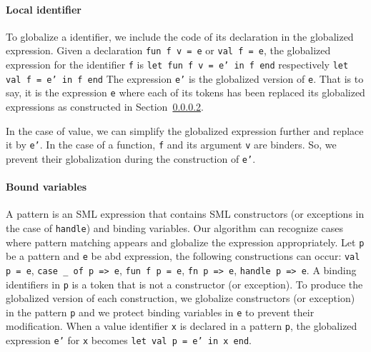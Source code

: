 \documentclass[runningheads,a4paper,draft]{svjour3}
\def\sml{\textsf{SML}\xspace}
\begin{document}
\paragraph{Local identifier}

To globalize a identifier, we include 
the code of its declaration in the globalized expression. 
Given a declaration \texttt{fun f v = e} or \texttt{val f = e}, the globalized 
expression for the identifier \texttt{f} is \texttt{let fun f v = e' in f 
end} respectively \texttt{let val f = e' in f end}
The expression \texttt{e'} is the globalized version of \texttt{e}. That is to 
say, it is the expression \texttt{e} where each of its tokens has been replaced 
its globalized expressions as constructed in Section~\ref{}.


In the case of value, we can simplify the globalized expression further and 
replace it by \texttt{e'}.
In the case of a function, \texttt{f} and its argument \texttt{v} are binders. 
So, we prevent their globalization during the construction of \texttt{e'}.

\paragraph{Bound variables}
A pattern is an \sml expression that 
contains \sml 
constructors (or exceptions in the case of \texttt{handle}) and binding 
variables. Our algorithm can recognize cases where pattern matching appears and 
globalize the expression appropriately.  Let \texttt{p} be a pattern 
and 
\texttt{e} be abd expression, the following constructions can 
occur: \texttt{val p = e}, \texttt{case \_ of p => e}, \texttt{fun f p = e}, 
\texttt{fn p => e}, \texttt{handle p => e}. A binding identifiers in \texttt{p}
is a token that is not a constructor (or exception). To produce the globalized 
version of each construction, we globalize constructors (or exception) in the 
pattern \texttt{p} and we protect binding variables in \texttt{e} to prevent 
their modification. When a value identifier \texttt{x} is declared in a pattern 
\texttt{p}, the globalized expression \texttt{e'} for \texttt{x} becomes 
\texttt{let val p = e' in x 
end}.                                                                           
                                                                                
\end{document}
